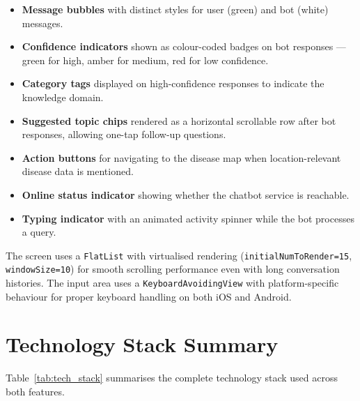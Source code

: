 \begin{itemize}
    \item \textbf{Message bubbles} with distinct styles for user (green) and bot (white) messages.
    \item \textbf{Confidence indicators} shown as colour-coded badges on bot responses --- green for high, amber for medium, red for low confidence.
    \item \textbf{Category tags} displayed on high-confidence responses to indicate the knowledge domain.
    \item \textbf{Suggested topic chips} rendered as a horizontal scrollable row after bot responses, allowing one-tap follow-up questions.
    \item \textbf{Action buttons} for navigating to the disease map when location-relevant disease data is mentioned.
    \item \textbf{Online status indicator} showing whether the chatbot service is reachable.
    \item \textbf{Typing indicator} with an animated activity spinner while the bot processes a query.
\end{itemize}

The screen uses a \texttt{FlatList} with virtualised rendering (\texttt{initialNumToRender=15}, \texttt{windowSize=10}) for smooth scrolling performance even with long conversation histories. The input area uses a \texttt{KeyboardAvoidingView} with platform-specific behaviour for proper keyboard handling on both iOS and Android.


\section{Technology Stack Summary}

Table~\ref{tab:tech_stack} summarises the complete technology stack used across both features.

